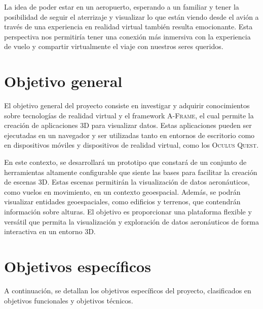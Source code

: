\documentclass[a4paper, 11pt]{book}
\begin{document}
La idea de poder estar en un aeropuerto, esperando a un familiar y tener la posibilidad de seguir el aterrizaje y visualizar lo que están viendo desde el avión a través de una experiencia en realidad virtual también resulta emocionante. Esta perspectiva nos permitiría tener una conexión más inmersiva con la experiencia de vuelo y compartir virtualmente el viaje con nuestros seres queridos. 


\newpage
\section{Objetivo general}
\label{sec:objetivoGeneral}
El objetivo general del proyecto consiste en investigar y adquirir conocimientos sobre tecnologías de realidad virtual y el framework \textsc{A-Frame}, el cual permite la creación de aplicaciones \gls{3D} para visualizar datos. Estas aplicaciones pueden ser ejecutadas en un navegador y ser utilizadas tanto en entornos de escritorio como en dispositivos móviles y dispositivos de realidad virtual, como los \textsc{Oculus Quest}.

En este contexto, se desarrollará un prototipo que constará de un conjunto de herramientas altamente configurable que siente las bases para facilitar la creación de escenas \textsc{3D}. 
Estas escenas permitirán la visualización de datos aeronáuticos, como vuelos en movimiento, en un contexto geoespacial. Además, se podrán visualizar entidades geoespaciales, como edificios y terrenos, que contendrán información sobre alturas. El objetivo es proporcionar una plataforma flexible y versátil que permita la visualización y exploración de datos aeronáuticos de forma interactiva en un entorno 3D.
\section{Objetivos específicos} %
\label{sec:objetivosEspecificos} %
A continuación, se detallan los objetivos específicos del proyecto, clasificados en objetivos funcionales y objetivos técnicos.
\end{document}
